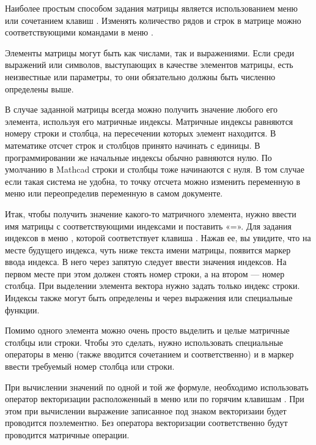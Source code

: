 Наиболее простым способом задания матрицы является использованием меню  или сочетанием клавиш . Изменять количество рядов и строк в матрице можно соответствующими командами в меню .

Элементы матрицы могут быть как числами, так и выражениями. Если среди выражений или символов, выступающих в качестве элементов матрицы, есть неизвестные или параметры, то они обязательно должны быть численно определены выше.

В случае заданной матрицы всегда можно получить значение любого его элемента, используя его матричные индексы. Матричные индексы равняются номеру строки и столбца, на пересечении которых элемент находится. В математике отсчет строк и столбцов принято начинать с единицы. В программировании же начальные индексы обычно равняются нулю. По умолчанию в Mathcad строки и столбцы тоже начинаются с нуля. В том случае если такая система не удобна, то точку отсчета можно изменить переменную  в меню  или переопределив переменную в самом документе.

Итак, чтобы получить значение какого-то матричного элемента, нужно ввести имя матрицы с соответствующими индексами и поставить «=». Для задания индексов  в меню , которой соответствует клавиша \keys{[}. Нажав ее, вы увидите, что на месте будущего индекса, чуть ниже текста имени матрицы, появится маркер ввода индекса. В него через запятую следует ввести значения индексов. На первом месте при этом должен стоять номер строки, а на втором --- номер столбца. При выделении элемента вектора нужно задать только индекс строки. Индексы также могут быть определены и через выражения или специальные функции.

Помимо одного элемента можно очень просто выделить и целые матричные столбцы или строки. Чтобы это сделать, нужно использовать специальные операторы в меню  (также вводится сочетанием  и   соответственно)  и в маркер ввести требуемый номер столбца или строки.

При вычислении значений по одной и той же формуле, необходимо использовать оператор векторизации расположенный в меню  или по горячим клавишам \keys{\ctrl+\shift+\textasciicircum}. При этом при вычислении выражение записанное под знаком векторизаии будет проводится поэлементно. Без оператора векторизации соответственно будут проводится матричные операции.

